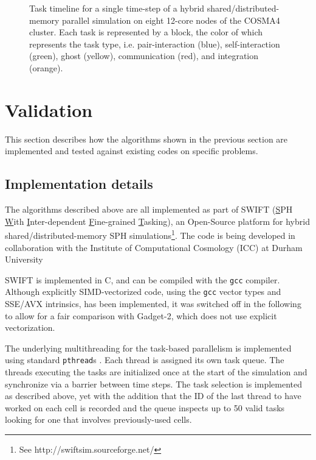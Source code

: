 \documentclass[final]{siamltex}
\begin{document}
\begin{figure}
    \centerline{}
    \caption{Task timeline for a single time-step of a hybrid
        shared/distributed-memory parallel simulation on
        eight 12-core nodes of the COSMA4 cluster.
        Each task is represented by a block, the color of which represents
        the task type, i.e. pair-interaction (blue), self-interaction (green),
        ghost (yellow), communication (red), and integration (orange).}
    \label{fig:TaskPlot}
\end{figure}


\section{Validation}

This section describes how the algorithms shown in the previous section
are implemented and tested against existing codes on specific problems.

\subsection{Implementation details}

The algorithms described above are all implemented as part
of SWIFT (\underline{S}PH \underline{W}ith
\underline{I}nter-dependent \underline{F}ine-grained
\underline{T}asking),
an Open-Source platform for hybrid shared/distributed-memory
SPH simulations\footnote{See http://swiftsim.sourceforge.net/}.
The code is being developed in collaboration with the Institute
of Computational Cosmology (ICC) at Durham University

SWIFT is implemented in C, and can be compiled with the
{\tt gcc} compiler.
Although explicitly SIMD-vectorized code, using the {\tt gcc} vector types
and SSE/AVX intrinsics, has been implemented, it was switched
off in the following to allow for a fair comparison with
Gadget-2, which does not use explicit vectorization.

The underlying multithreading for the task-based parallelism is
implemented using standard {\tt pthread}s \cite{ref:pthreads}.
Each thread is assigned its own task queue.
The threads executing the tasks are initialized once at the
start of the simulation
and synchronize via a barrier between time steps.
The task selection is implemented as described above, yet with the
addition that the ID of the last thread to have worked on each
cell is recorded and the queue inspects up to 50 valid tasks 
looking for one that involves previously-used cells.
\end{document}

